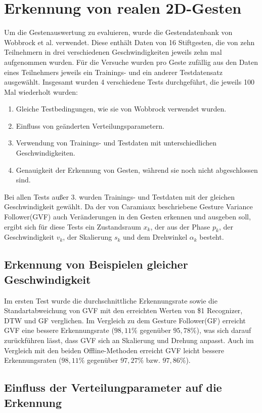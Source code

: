 \documentclass{llncs}
\begin{document}
\section{Erkennung von realen 2D-Gesten}
Um die Gestenauswertung zu evaluieren, wurde die Gestendatenbank von Wobbrock et al.\cite{Wobbrock2007} verwendet. Diese enthält Daten von 16 Stiftgesten, die von zehn Teilnehmern in drei verschiedenen Geschwindigkeiten jeweils zehn mal aufgenommen wurden. Für die Versuche wurden pro Geste zufällig aus den Daten eines Teilnehmers jeweils ein Trainings- und ein anderer Testdatensatz ausgewählt. Insgesamt wurden 4 verschiedene Tests durchgeführt, die jeweils 100 Mal wiederholt wurden:
\begin{enumerate}
\item Gleiche Testbedingungen, wie sie von Wobbrock\cite{Wobbrock2007} verwendet wurden.
\item Einfluss von geänderten Verteilungsparametern.
\item Verwendung von Trainings- und Testdaten mit unterschiedlichen Geschwindigkeiten.
\item Genauigkeit der Erkennung von Gesten, während sie noch nicht abgeschlossen sind.
\end{enumerate}
Bei allen Tests außer 3. wurden Trainings- und Testdaten mit der gleichen Geschwindigkeit gewählt.
Da der von Caramiaux\cite{Caramiaux2014} beschriebene Gesture Variance Follower(GVF) auch Veränderungen in den Gesten erkennen und ausgeben soll, ergibt sich für diese Tests ein Zustandsraum $x_k$, der aus der Phase $p_k$, der Geschwindigkeit $v_k$, der Skalierung $s_k$ und dem Drehwinkel $\alpha_k$ besteht.

\subsection{Erkennung von Beispielen gleicher Geschwindigkeit}
Im ersten Test wurde die durchschnittliche Erkennungsrate sowie die Standartabweichung von GVF mit den erreichten Werten von \$1 Recognizer\cite{Wobbrock2007}, DTW und GF verglichen. 
Im Vergleich zu dem Gesture Follower(GF) erreicht GVF eine bessere Erkennungsrate ($98,11 \%$ gegenüber $95,78\%$), was sich darauf zurückführen lässt, dass GVF sich an Skalierung und Drehung anpasst.
Auch im Vergleich mit den beiden Offline-Methoden erreicht GVF leicht bessere Erkennungsraten ($98,11\%$ gegenüber $97,27\%$ bzw. $97,86\%$).

\subsection{Einfluss der Verteilungparameter auf die Erkennung}
\end{document}
